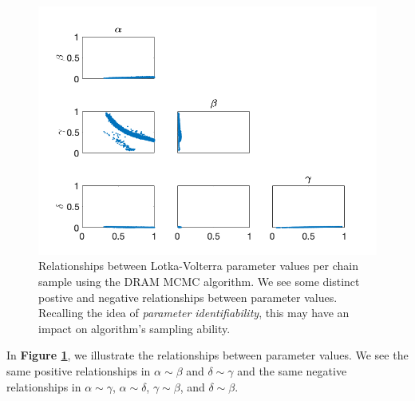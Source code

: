 \documentclass{article}
\begin{document}
\begin{figure}[H]
    \centering
    \includegraphics[width=15cm]{MCMC_figs/met_lv_final/final_dram_samples.png}
    \caption{Relationships between Lotka-Volterra parameter values per chain sample using the DRAM MCMC algorithm. We see some distinct postive and negative relationships between parameter values. Recalling the idea of \textit{parameter identifiability}, this may have an impact on algorithm's sampling ability.}
    \label{fig:8mcmc}
\end{figure}
In \textbf{Figure \ref{fig:8mcmc}}, we illustrate the relationships between parameter values. We see the same positive relationships in $\alpha \sim \beta$ and $\delta \sim \gamma$ and the same negative relationships in $\alpha \sim \gamma$, $\alpha \sim \delta$, $\gamma \sim \beta$, and $\delta \sim \beta$. \\
\end{document}
